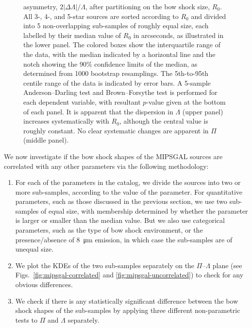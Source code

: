 \begin{figure}
{    asymmetry, \(2 |\Delta\Lambda| / \Lambda\), after partitioning on the bow shock
    size, \(R_0\).  All 3-, 4-, and 5-star sources are sorted
    according to \(R_0\) and divided into 5 non-overlapping
    sub-samples of roughly equal size, each labelled by their median
    value of \(R_0\) in arcseconds, as illustrated in the lower panel.
    The colored boxes show the interquartile range of the data, with
    the median indicated by a horizontal line and the notch showing
    the 90\% confidence limits of the median, as determined from 1000
    bootstrap resamplings.  The 5th-to-95th centile range of the data
    is indicated by error bars.  A 5-sample Anderson--Darling test and
    Brown--Forsythe test is performed for each dependent variable, with
    resultant \(p\)-value given at the bottom of each panel.  It is
    apparent that the dispersion in \(\Lambda\) (upper panel) increases
    systematically with \(R_0\), although the central value is roughly
    constant.  No clear systematic changes are apparent in \(\Pi\)
    (middle panel).}
  \label{fig:mipsgal-boxplot}
\end{figure}


We now investigate if the bow shock shapes of the MIPSGAL sources are
correlated with any other parameters via the following methodology:
\begin{enumerate}[1.]
\item For each of the parameters in the \citet{Kobulnicky:2016a}
  catalog, we divide the sources into two or more sub-samples,
  according to the value of the parameter.  For quantitative
  parameters, such as those discussed in the previous section, we use
  two sub-samples of equal size, with membership determined by whether
  the parameter is larger or smaller than the median value.  But we
  also use categorical parameters, such as the type of bow shock
  environment, or the presence/absence of \SI{8}{\um} emission, in
  which case the sub-samples are of unequal size.
\item We plot the KDEs of the two sub-samples separately on the
  \(\Pi\)--\(\Lambda\) plane (see Figs.~\ref{fig:mipsgal-correlated} and
  \ref{fig:mipsgal-uncorrelated}) to check for any obvious
  differences.
\item We check if there is any statistically significant difference
  between the bow shock shapes of the sub-samples by applying three
  different non-parametric tests to \(\Pi\) and \(\Lambda\)
  separately.  
\end{enumerate}

